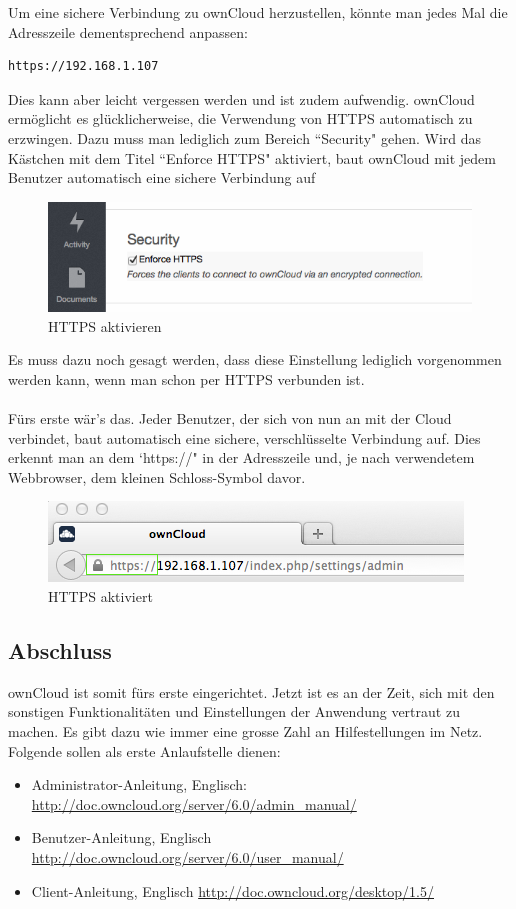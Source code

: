 Um eine sichere Verbindung zu ownCloud herzustellen, könnte man jedes Mal die Adresszeile dementsprechend anpassen: 

\begin{lstlisting}
https://192.168.1.107
\end{lstlisting}

Dies kann aber leicht vergessen werden und ist zudem aufwendig. ownCloud ermöglicht es glücklicherweise, die Verwendung von HTTPS automatisch zu erzwingen. Dazu muss man lediglich zum Bereich ``Security" gehen. Wird das Kästchen mit dem Titel ``Enforce HTTPS" aktiviert, baut ownCloud mit jedem Benutzer automatisch eine sichere Verbindung auf

\begin{figure}[h]
\centering
\includegraphics[scale=0.5]{images/https_checkbox_ticked}
\caption{HTTPS aktivieren}
\end{figure}

Es muss dazu noch gesagt werden, dass diese Einstellung lediglich vorgenommen werden kann, wenn man schon per HTTPS verbunden ist.
\\
\\
Fürs erste wär's das. Jeder Benutzer, der sich von nun an mit der Cloud verbindet, baut automatisch eine sichere, verschlüsselte Verbindung auf. Dies erkennt man an dem `https://" in der Adresszeile und, je nach verwendetem Webbrowser, dem kleinen Schloss-Symbol davor. 

\begin{figure}[h]
\centering
\includegraphics[scale=0.65]{images/https_connection}
\caption{HTTPS aktiviert}
\end{figure}

\subsection{Abschluss}
ownCloud ist somit fürs erste eingerichtet. Jetzt ist es an der Zeit, sich mit den sonstigen Funktionalitäten und Einstellungen der Anwendung vertraut zu machen. Es gibt dazu wie immer eine grosse Zahl an Hilfestellungen im Netz.
Folgende sollen als erste Anlaufstelle dienen:

\begin{itemize}
\item Administrator-Anleitung, Englisch: \url{http://doc.owncloud.org/server/6.0/admin_manual/}
\item Benutzer-Anleitung, Englisch \url{http://doc.owncloud.org/server/6.0/user_manual/}
\item Client-Anleitung, Englisch \url{http://doc.owncloud.org/desktop/1.5/}
\end{itemize}